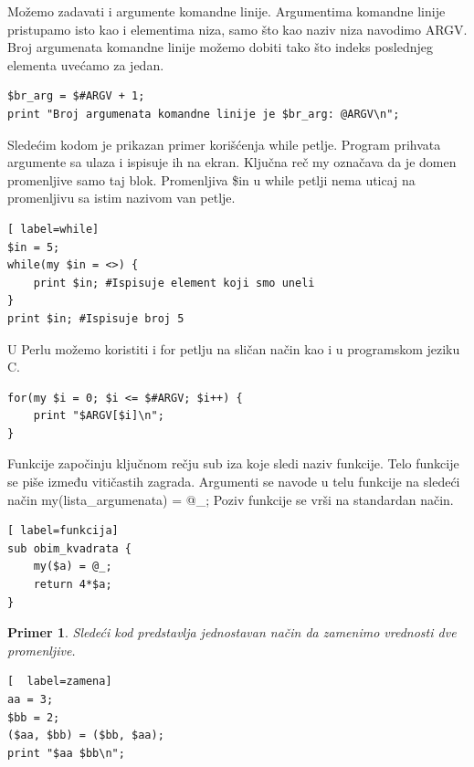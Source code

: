 \documentclass[a4paper]{article}
\newtheorem{primer}{Primer}[section]
\begin{document}
Možemo zadavati i argumente komandne linije. Argumentima komandne linije pristupamo isto kao i elementima niza, samo što kao naziv niza navodimo ARGV. Broj argumenata komandne linije možemo dobiti tako što indeks poslednjeg elementa uvećamo za jedan.
\begin{lstlisting}[label=argv]
$br_arg = $#ARGV + 1;
print "Broj argumenata komandne linije je $br_arg: @ARGV\n";
\end{lstlisting}
Sledećim kodom je prikazan primer korišćenja while petlje. Program prihvata argumente sa ulaza i ispisuje ih na ekran. Ključna reč my označava da je domen promenljive samo taj blok. Promenljiva \$in u while petlji nema uticaj na promenljivu sa istim nazivom van petlje.
\begin{lstlisting}[ label=while]
$in = 5;
while(my $in = <>) {
    print $in; #Ispisuje element koji smo uneli
}
print $in; #Ispisuje broj 5
\end{lstlisting}
U Perlu možemo koristiti i for petlju na sličan način kao i u programskom jeziku C.
\begin{lstlisting}[label=for]
for(my $i = 0; $i <= $#ARGV; $i++) {
    print "$ARGV[$i]\n";
}
\end{lstlisting}
Funkcije započinju ključnom rečju sub iza koje sledi naziv funkcije. Telo funkcije se piše između vitičastih zagrada. Argumenti se navode u telu funkcije na sledeći način my(lista\_argumenata) = @\_; Poziv funkcije se vr\v si na standardan na\v cin.
\begin{lstlisting}[ label=funkcija]
sub obim_kvadrata {
    my($a) = @_;
    return 4*$a;
}
\end{lstlisting}

\begin{primer}
Sledeći kod predstavlja jednostavan način da zamenimo vrednosti dve promenljive.
\begin{lstlisting}[  label=zamena]
aa = 3;
$bb = 2;
($aa, $bb) = ($bb, $aa);
print "$aa $bb\n";

\end{lstlisting}

\end{primer}
\end{document}
